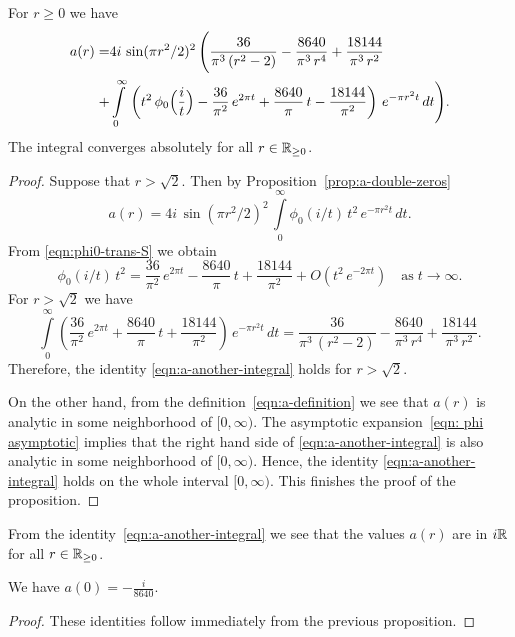\begin{proposition}\label{prop:a-another-integral}
For $r\geq0$ we have
\begin{align}\label{eqn:a-another-integral}a(r)=&4i\,\sin(\pi r^2/2)^2\,\Bigg(\frac{36}{\pi^3\,(r^2-2)}-\frac{8640}{\pi^3\,r^4}+\frac{18144}{\pi^3\,r^2}\\ +&\int\limits_0^\infty\,\left(t^2\,\phi_0\Big(\frac{i}{t}\Big)-\frac{36}{\pi^2}\,e^{2\pi t}+\frac{8640}{\pi}\,t-\frac{18144}{\pi^2}\right)\,e^{-\pi r^2 t}\,dt \Bigg) .\notag\end{align}
The integral converges absolutely for all $r\in\mathbb{R}_{\geq 0}$.
\end{proposition}
\begin{proof}
Suppose that $r>\sqrt{2}$. Then by Proposition~\ref{prop:a-double-zeros}
$$a(r)=4i\,\sin(\pi r^2/2)^2\,\int\limits_{0}^{\infty}\phi_0(i/t)\,t^2\,e^{-\pi r^2 t}\,dt. $$
From \eqref{eqn:phi0-trans-S} we obtain
\begin{equation}\label{eqn: phi asymptotic}
\phi_0(i/t)\,t^2=\frac{36}{\pi^2}\,e^{2 \pi t}-\frac{8640}{\pi}\,t+\frac{18144}{\pi^2}+O(t^2\,e^{-2\pi t})\quad\mbox{as}\;t\to\infty.
\end{equation}
For $r>\sqrt{2}$ we have
\begin{equation}
\int\limits_0^\infty \left(\frac{36}{\pi^2}\,e^{2 \pi t}+\frac{8640}{\pi}\,t+\frac{18144}{\pi^2}\right)\,e^{-\pi r^2 t}\,dt
=\frac{36}{\pi^3\,(r^2-2)}-\frac{8640}{\pi^3\,r^4}+\frac{18144}{\pi^3\,r^2}.\end{equation}
Therefore, the identity \eqref{eqn:a-another-integral} holds for $r>\sqrt{2}$.

On the other hand, from the definition~\eqref{eqn:a-definition} we see that $a(r)$ is analytic in some neighborhood of $[0,\infty)$. The asymptotic expansion~\eqref{eqn: phi asymptotic} implies that the right hand side of \eqref{eqn:a-another-integral} is also analytic in some neighborhood of $[0,\infty)$. Hence, the identity \eqref{eqn:a-another-integral} holds on the whole interval $[0,\infty)$. This finishes the proof of the proposition.
\end{proof}
From the identity~\eqref{eqn:a-another-integral} we see that the values $a(r)$ are in $i\mathbb{R}$ for all $r\in\mathbb{R}_{\geq0}$.
\begin{proposition}\label{prop:a0}\leanok
We have $a(0) = -\frac{i}{8640}$.
\end{proposition}
\begin{proof}
These identities follow immediately from the previous proposition.
\end{proof}


